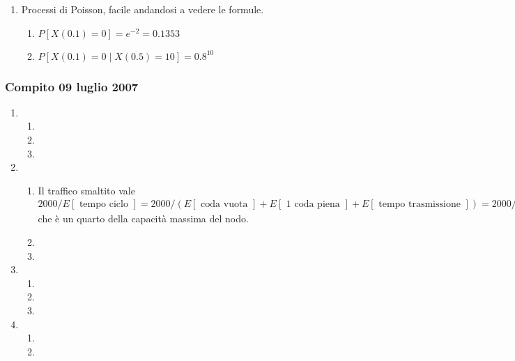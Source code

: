 \documentclass{article}
\begin{document}
\begin{enumerate}
\begin{enumerate}[label=\alph*)]
        \item\begin{align*}
        T = \left[\begin{array}{c c c}
        -&T&-\\\beta T&-&\frac{\beta T}{2}\\\gamma T&-&-\\
        \end{array}\right]
        \end{align*}
    \end{enumerate}

    \item Processi di Poisson, facile andandosi a vedere le formule.
    \begin{enumerate}[label=\alph*)]
        \item $P[X(0.1) = 0] = e^{-2} = 0.1353$
        \item $P[X(0.1) = 0\mid X(0.5) = 10] = 0.8^{10}$
    \end{enumerate}
\end{enumerate}

\subsubsection{Compito 09 luglio 2007}
\begin{enumerate}
    \item\begin{enumerate}[label=\alph*)]
        \item
        \item
        \item
    \end{enumerate}
    
    \item\begin{enumerate}[label=\alph*)]
        \item Il traffico smaltito vale $2000 / E[\text{ tempo ciclo }] = 2000/(E[\text{ coda vuota }] + E[\text{ 1 coda piena }] + E[\text{ tempo trasmissione }]) = 2000 / (\frac{1}{2\lambda} + \frac{1}{\lambda} + 10^{-3}) = 0.5 \text{ Mbps}$ che è un quarto della capacità massima del nodo.
        \item
        \item
    \end{enumerate}
    
    \item\begin{enumerate}[label=\alph*)]
        \item
        \item
        \item
    \end{enumerate}
    
    \item\begin{enumerate}[label=\alph*)]
        \item
        \item
    \end{enumerate}
\end{enumerate}
\end{document}
